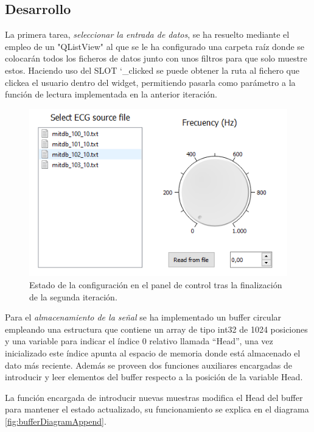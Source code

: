     \subsection{Desarrollo}
        
        La primera tarea, \textit{seleccionar la entrada de datos}, se ha resuelto mediante el empleo de un "QListView" \cite{QListView} al que se le ha configurado una carpeta raíz donde se colocarán todos los ficheros de datos junto con unos filtros para que solo muestre estos. Haciendo uso del SLOT \char`_clicked se puede obtener la ruta al fichero que clickea el usuario dentro del widget, permitiendo pasarla como parámetro a la función de lectura implementada en la anterior iteración. 
        
        \begin{figure}[H] 
                \centering
                        \includegraphics[width = 0.8 \linewidth]{figuras/fileView.png}
                \caption{Estado de la configuración en el panel de control tras la finalización de la segunda iteración.}
                \label{fig:fileView}
        \end{figure}
        
        Para el \textit{almacenamiento de la señal} se ha implementado un buffer circular empleando una estructura que contiene un array de tipo int32 de 1024 posiciones y una variable para indicar el índice 0 relativo llamada “Head”, una vez inicializado este índice apunta al espacio de memoria donde está almacenado el dato más reciente. Además se proveen dos funciones auxiliares encargadas de introducir y leer elementos del buffer respecto a la posición de la variable Head. 
        
        La función encargada de introducir nuevas muestras modifica el Head del buffer para mantener el estado actualizado, su funcionamiento se explica en el diagrama \ref{fig:bufferDiagramAppend}. 
    
